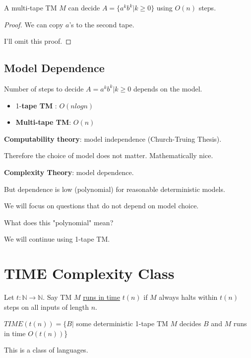 \begin{theorem}
    A multi-tape TM \(M\) can decide \(A = \{a^k b^k | k\geq 0\}\) using \(O(n)\) steps. 
\end{theorem}
\begin{proof}
    We can copy \(a\)'s to the second tape. 

    I'll omit this proof.
\end{proof}

\subsection{Model Dependence}
Number of steps to decide \(A= {a^k b^k | k \geq 0}\) depends on the model. 
\begin{itemize}
    \item 1-\textbf{tape TM} : \(O(n log n)\)
    \item \textbf{Multi-tape TM}: \(O(n)\)   
\end{itemize}

\textbf{Computability theory}: model independence (Church-Truing Thesis).

Therefore the choice of model does not matter. Mathematically nice.

\textbf{Complexity Theory}: model dependence. 

But dependence is low (polynomial) for reasonable deterministic models.

We will focus on questions that do not depend on model choice.

\begin{note}
    What does this "polynomial" mean?
\end{note}

We will continue using 1-tape TM.

 
\section{TIME Complexity Class}
\begin{definition}
    Let \(t: \mathbb{N} \rightarrow \mathbb{N}\). 
    Say TM \(M\) \underline{runs in time}  \(t(n)\) if \(M\) always halts within \(t(n)\) steps on all inputs of length \(n\).   
\end{definition}

\begin{definition}[TIME(t(n))]
    \(TIME(t(n)) = \{B |\) some deterministic 1-tape TM \(M\) decides \(B\) and \(M\) runs in time \(O(t(n))\)\} 

    This is a class of languages.
\end{definition}

